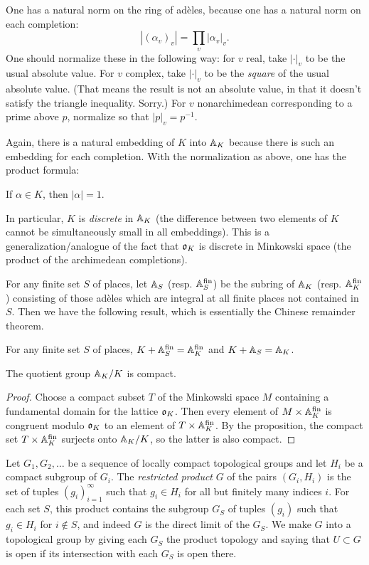 One has a natural norm on the ring of ad\`eles, because one has a natural norm
on each completion:
\[
|(\alpha_v)_v| = \prod_v |\alpha_v|_v.
\]
One should normalize these in the following way: for $v$ real, take
$|\cdot|_v$ to be the usual absolute value. For $v$ complex, take
$|\cdot|_v$ to be the \emph{square} of the usual absolute value. (That means
the result is not an absolute value, in that it doesn't satisfy the triangle
inequality. Sorry.) For $v$ nonarchimedean corresponding to a prime above $p$,
normalize so that $|p|_v = p^{-1}$.

Again, there is a natural embedding of $K$ into $\AA_K$ because there
is such an embedding for each completion.
With the normalization as above, one has the product formula:
\begin{prop}
If $\alpha \in K$, then $|\alpha| = 1$.
\end{prop}
In particular, $K$ is \emph{discrete} in $\AA_K$ (the difference between
two elements of $K$ cannot be simultaneously small in all embeddings).
This is a generalization/analogue of the fact that $\gotho_K$ is
discrete in Minkowski space (the product of the archimedean completions).

For any finite set $S$ of places, let $\AA_S$ (resp. $\AA^{\fin}_S$)
be the subring of $\AA_K$ (resp. $\AA^{\fin}_K$) consisting of
those ad\`eles which are integral at all finite places not contained in $S$.
Then we have the following result, which is essentially the Chinese remainder
theorem.
\begin{prop} \label{P:adelic CRT}
For any finite set $S$ of places, $K + \AA_S^{\fin} = \AA_K^{\fin}$ and
$K + \AA_S = \AA_K$.
\end{prop}
\begin{cor}
The quotient group $\AA_K/K$ is compact.
\end{cor}
\begin{proof}
Choose a compact subset $T$ of the Minkowski space $M$ containing a fundamental domain for the lattice $\gotho_K$.
Then every element of $M \times \AA^{\fin}_K$ is congruent modulo $\gotho_K$
to an element of $T \times \AA^{\fin}_K$. By the proposition,
the compact set $T \times \AA^{\fin}_K$ surjects onto $\AA_K/K$, so the
latter is also compact.
\end{proof}


Let $G_1, G_2, \dots$ be a sequence of locally compact topological groups
and let $H_i$ be a compact subgroup of $G_i$. The \emph{restricted product} $G$
of the pairs $(G_i, H_i)$ is the set of tuples $(g_i)_{i=1}^\infty$ such
that $g_i \in H_i$ for all but finitely many indices $i$. For each set $S$,
this product contains the subgroup $G_S$ of tuples $(g_i)$ such that $g_i
\in H_i$ for $i \notin S$, and indeed $G$ is the direct limit of the $G_S$.
We make $G$ into a topological group by giving each $G_S$ the product topology
and saying that $U \subset G$ is open if its intersection with each $G_S$
is open there.


